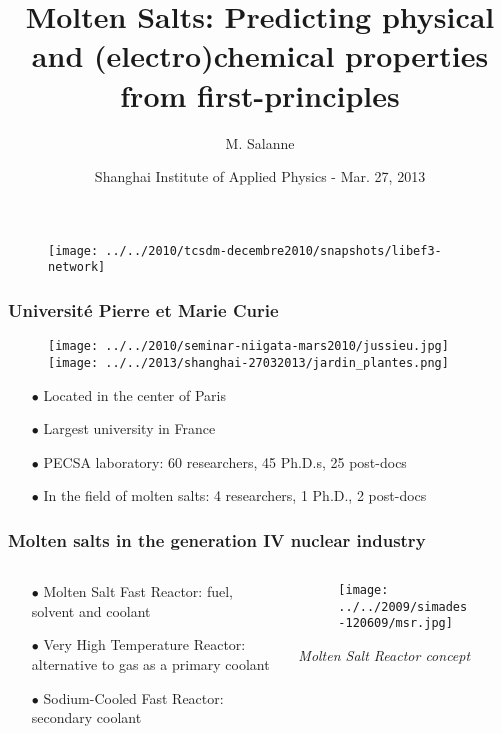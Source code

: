 \documentclass{beamer}
\title[From first-principles to material properties]
{
Molten Salts:  Predicting physical and (electro)chemical properties from first-principles 
}
\author[M. Salanne]{
  M. Salanne}
\institute[UPMC]{
  Universit\'e Pierre et Marie Curie -- Paris -- France  \\
  http://www.pecsa.upmc.fr
}
\date[Mar. 27, 2013]{\alert{Shanghai Institute of Applied Physics - Mar. 27, 2013}}
\begin{document}
\makeatletter
  \gdef\inserttotalframenumber{\inserttotalframenumbernew}
\makeatother

\begin{frame}
 \titlepage
 \vspace{-0.5cm}
   \begin{figure}
   \texttt{[image: ../../2010/tcsdm-decembre2010/snapshots/libef3-network]}
   \end{figure}
\end{frame}

\begin{frame}
   \frametitle{Universit\'e Pierre et Marie Curie}
  \begin{figure}
    \texttt{[image: ../../2010/seminar-niigata-mars2010/jussieu.jpg]}\hspace{0.5cm}
    \texttt{[image: ../../2013/shanghai-27032013/jardin\_plantes.png]}
  \end{figure}
  \begin{itemize}
      \item[$\bullet$] Located in the center of Paris
      \item[$\bullet$] Largest university in France 
      \item[$\bullet$] PECSA laboratory: 60 researchers, 45 Ph.D.s, 25 post-docs
      \item[$\bullet$] In the field of molten salts: 4 researchers, 1 Ph.D., 2 post-docs
  \end{itemize}
\end{frame}

\begin{frame}
   \frametitle{Molten salts in the generation IV nuclear industry}
   \begin{columns}
      \begin{column}{6cm}
         \begin{itemize}
            \item[$\bullet$] Molten Salt Fast Reactor:
 \newline \alert{fuel}, \alert{solvent} and \alert{coolant} 
            \item[$\bullet$] Very High Temperature Reactor: alternative to gas as a \alert{primary coolant}   
            \item[$\bullet$] Sodium-Cooled Fast Reactor: \alert{secondary coolant}
         \end{itemize}
      \end{column}
      \begin{column}{6cm}
         \begin{figure}
            \texttt{[image: ../../2009/simades-120609/msr.jpg]}
         \end{figure}
         \vspace{-0.5cm}
         \begin{center}
            {\small \it Molten Salt Reactor concept}
         \end{center}
      \end{column}
   \end{columns}
\end{frame}
\end{document}
